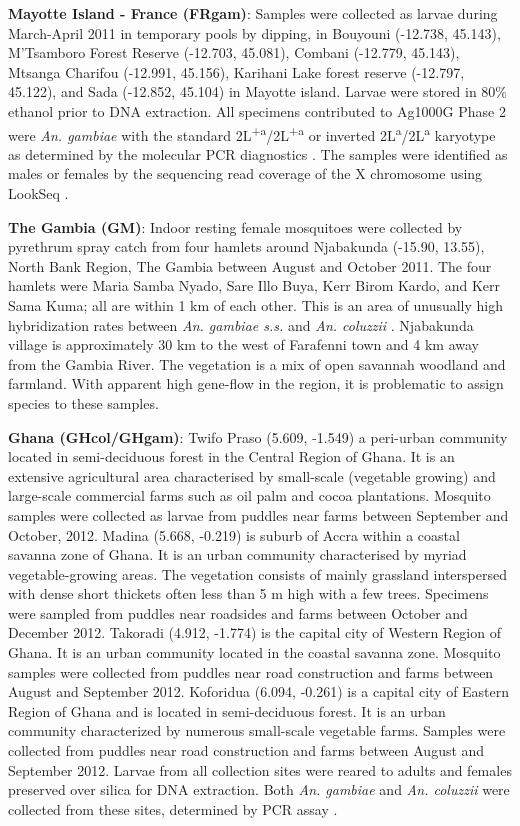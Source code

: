 \documentclass[a4paper,11pt,abstracton,hidelinks]{scrartcl}
\begin{document}
%
\textbf{Mayotte Island - France (FRgam)}: Samples were collected as larvae during March-April 2011 in temporary pools by dipping, in Bouyouni (-12.738, 45.143), M'Tsamboro Forest Reserve (-12.703, 45.081), Combani (-12.779, 45.143), Mtsanga Charifou (-12.991, 45.156), Karihani Lake forest reserve (-12.797, 45.122), and Sada (-12.852, 45.104) in Mayotte island.
%
Larvae were stored in 80\% ethanol prior to DNA extraction. 
%
All specimens contributed to Ag1000G Phase 2 were \textit{An. gambiae} \cite{Santolamazza2004} with the standard 2L\textsuperscript{+a}/2L\textsuperscript{+a} or inverted 2L\textsuperscript{a}/2L\textsuperscript{a} karyotype as determined by the molecular PCR diagnostics \cite{White2007}.
%
The samples were identified as males or females by the sequencing read coverage of the X chromosome using LookSeq \cite{Manske2009}.

%
\textbf{The Gambia (GM)}: Indoor resting female mosquitoes were collected by pyrethrum spray catch from four hamlets around Njabakunda (-15.90, 13.55), North Bank Region, The Gambia between August and October 2011.
%
The four hamlets were Maria Samba Nyado, Sare Illo Buya, Kerr Birom Kardo, and Kerr Sama Kuma; all are within 1 km of each other.
%
This is an area of unusually high hybridization rates between \textit{An. gambiae s.s.} and \textit{An. coluzzii} \cite{Caputo2008, Nwakanma2013}.
%
Njabakunda village is approximately 30 km to the west of Farafenni town and 4 km away from the Gambia River.
%
The vegetation is a mix of open savannah woodland and farmland.
%
With apparent high gene-flow in the region, it is problematic to assign species to these samples.

%
\textbf{Ghana (GHcol/GHgam)}: Twifo Praso (5.609, -1.549) a peri-urban community located in semi-deciduous forest in the Central Region of Ghana.
%
It is an extensive agricultural area characterised by small-scale (vegetable growing) and large-scale commercial farms such as oil palm and cocoa plantations.
%
Mosquito samples were collected as larvae from puddles near farms between September and October, 2012.
%
Madina (5.668,	-0.219) is suburb of Accra within a coastal savanna zone of Ghana. 
%
It is an urban community characterised by myriad vegetable-growing areas.
%
The vegetation consists of mainly grassland interspersed with dense short thickets often less than 5 m high with a few trees.
%
Specimens were sampled from puddles near roadsides and farms between October and December 2012.
%
Takoradi (4.912, -1.774) is the capital city of Western Region of Ghana.
%
It is an urban community located in the coastal savanna zone.
%
Mosquito samples were collected from puddles near road construction and farms between August and September 2012.
%
Koforidua (6.094, -0.261) is a capital city of Eastern Region of Ghana and is located in semi-deciduous forest. 
%
It is an urban community characterized by numerous small-scale vegetable farms. 
%
Samples were collected from puddles near road construction and farms between August and September 2012.
%
Larvae from all collection sites were reared to adults and females preserved over silica for DNA extraction.
%
Both \textit{An. gambiae} and \textit{An. coluzzii} were collected from these sites, determined by PCR assay \cite{Santolamazza2008}.
\end{document}
